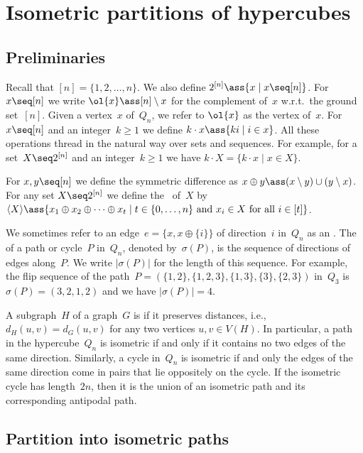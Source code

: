 \documentclass[a4paper,11pt,reqno]{amsart}
\begin{document}
\section{Isometric partitions of hypercubes}

\subsection{Preliminaries}

Recall that $[n]=\{1,2,\ldots,n\}$.
We also define $2^{[n]}\ass\{x\mid x\seq [n]\}$.
For $x\seq [n]$ we write $\ol{x}\ass[n]\setminus x$ for the complement of~$x$ w.r.t.\ the ground set~$[n]$.
Given a vertex~$x$ of~$Q_n$, we refer to $\ol{x}$ as the  vertex of~$x$.
For $x\seq [n]$ and an integer~$k\geq 1$ we define $k\cdot x\ass\{ki\mid i\in x\}$.
All these operations thread in the natural way over sets and sequences.
For example, for a set~$X\seq 2^{[n]}$ and an integer~$k\geq 1$ we have $k\cdot X=\{k\cdot x\mid x\in X\}$.

For $x,y\seq [n]$ we define the symmetric difference as $x\oplus y\ass(x\setminus y)\cup (y\setminus x)$.
For any set $X\seq 2^{[n]}$ we define the ~of~$X$ by $\langle X\rangle\ass\{x_1\oplus x_2\oplus \cdots\oplus x_t\mid t\in\{0,\ldots,n\}\text{ and } x_i\in X\text{ for all }i\in[t]\}$.

We sometimes refer to an edge~$e=\{x,x\oplus\{i\}\}$ of direction~$i$ in~$Q_n$ as an .
The  of a path or cycle~$P$ in~$Q_n$, denoted by~$\sigma(P)$, is the sequence of directions of edges along~$P$.
We write $|\sigma(P)|$ for the length of this sequence.
For example, the flip sequence of the path~$P=(\{1,2\},\{1,2,3\},\{1,3\},\{3\},\{2,3\})$ in~$Q_3$ is $\sigma(P)=(3,2,1,2)$ and we have $|\sigma(P)|=4$.

A subgraph~$H$ of a graph~$G$ is  if it preserves distances, i.e., $d_H(u,v)=d_G(u,v)$ for any two vertices $u,v \in V(H)$.
In particular, a path in the hypercube~$Q_n$ is isometric if and only if it contains no two edges of the same direction.
Similarly, a cycle in~$Q_n$ is isometric if and only the edges of the same direction come in pairs that lie oppositely on the cycle.
If the isometric cycle has length~$2n$, then it is the union of an isometric path and its corresponding antipodal path.

\subsection{Partition into isometric paths}
\label{sec:part}
\end{document}

